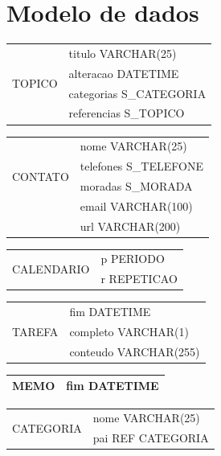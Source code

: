 \documentclass[a4paper,12pt]{article}
\begin{document}
\section{Modelo de dados}

	\begin{multicols}{2}

		\begin{tabular}{|c|l|} \hline
			\multirow{4}{*}{TOPICO}
			& titulo VARCHAR(25) \\
			& alteracao DATETIME \\ 
			& categorias S\_CATEGORIA \\
			& referencias S\_TOPICO\\ \hline 
		\end{tabular}
		
		\begin{tabular}{|c|l|} \hline
			\multirow{4}{*}{CONTATO}
			& nome VARCHAR(25) \\
			& telefones S\_TELEFONE \\ 
			& moradas S\_MORADA \\
			& email VARCHAR(100) \\ 
			& url VARCHAR(200) \\ \hline 
		\end{tabular}
		
		\begin{tabular}{|c|l|} \hline
			\multirow{2}{*}{CALENDARIO}
			& p PERIODO \\
			& r REPETICAO \\ \hline 
		\end{tabular}
		
		\begin{tabular}{|c|l|} \hline
			\multirow{3}{*}{TAREFA}
			& fim DATETIME \\
			& completo VARCHAR(1) \\ 
			& conteudo VARCHAR(255) \\ \hline 
		\end{tabular}
		
		\begin{tabular}{|c|l|} \hline
			MEMO & fim DATETIME \\ \hline
		\end{tabular}
		
		\begin{tabular}{|c|l|} \hline
			\multirow{2}{*}{CATEGORIA}
			& nome VARCHAR(25) \\
			& pai REF CATEGORIA \\ \hline 
		\end{tabular}
		

\end{multicols}
\end{document}
